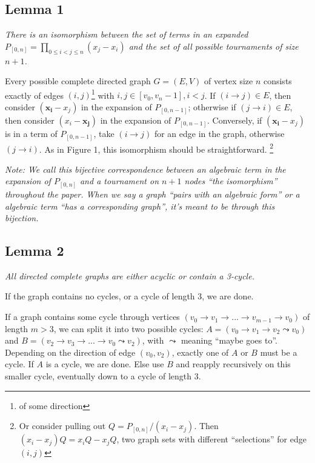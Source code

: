 \documentclass[11pt, oneside]{article} 	%
\begin{document}
\subsection{Lemma 1}

\emph{There is an isomorphism between the set of terms in an expanded $P_{[0,n]} =\prod_{0 \leq i < j \leq n}(x_j - x_i)$ and the set of all possible tournaments of size $n+1$.}

Every possible complete directed graph  $G = (E,V)$ of vertex size $n$  consists exactly of edges $(i, j)$\footnote{of some direction} with $i, j \in [v_0, v_n-1], i < j$.  If $(i \rightarrow j) \in E$, then consider $(\mathbf{x_i} - x_j)$ in the expansion of $P_{[0, n-1]}$; otherwise if $(j \rightarrow i) \in E$, then consider $(x_i - \mathbf{x_j})$ in the expansion of $P_{[0, n-1]}$.  Conversely, if $(\mathbf{x_i} - x_j)$ is in a term of $P_{[0, n-1]}$, take $(i \rightarrow j)$ for an edge in the graph, otherwise $(j \rightarrow i)$.  As in Figure 1, this isomorphism should be straightforward.
\footnote{Or consider pulling out $Q = P_{[0,n]}/(x_i - x_j)$.  Then $(x_i - x_j)Q = x_iQ - x_jQ$, two graph sets with different ``selections'' for edge $(i,j)$}

\emph{Note: We call this bijective correspondence between an algebraic term in the expansion of $P_{[0,n]}$ and a tournament on $n+1$ nodes ``the isomorphism'' throughout the paper. When we say a graph ``pairs with an algebraic form'' or a algebraic term ``has a corresponding graph'', it's meant to be through this bijection.}

\subsection{Lemma 2}

\emph{All directed complete graphs are either acyclic or contain a 3-cycle.}

If the graph contains no cycles, or a cycle of length 3, we are done.

If a graph contains some cycle through vertices $(v_0 \rightarrow v_{1} \rightarrow  ...  \rightarrow v_{m-1} \rightarrow  v_0)$ of length $m > 3$, we can split it into two possible cycles: $A = (v_0 \rightarrow  v_{1} \rightarrow v_{2} \leadsto  v_0)$ and $B = (v_{2} \rightarrow  v_{3} \rightarrow  ... \rightarrow v_{0} \leadsto v_{2} )$, with $\leadsto$ meaning ``maybe goes to''.  Depending on the direction of edge $(v_{0}, v_{2})$, exactly one of $A$ or $B$ must be a cycle.  If $A$ is a cycle, we are done.  Else use $B$ and reapply recursively on this smaller cycle, eventually down to a cycle of length 3.
\end{document}
